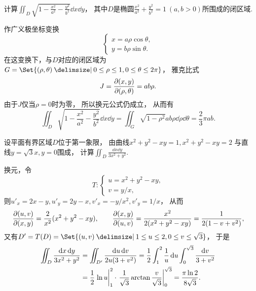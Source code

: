 \begin{example}
计算\(\iint_D \sqrt{1 - \frac{x^2}{a^2} - \frac{y^2}{b^2}} \dd{x} \dd{y}\)，
其中\(D\)是椭圆\(\frac{x^2}{a^2} + \frac{y^2}{b^2} = 1\ (a,b>0)\)所围成的闭区域.
\begin{solution}
作广义极坐标变换\begin{equation*}
	\left\{ \begin{array}{l}
		x = a \rho \cos\theta, \\
		y = b \rho \sin\theta.
	\end{array} \right.
\end{equation*}
在这变换下，与\(D\)对应的闭区域为
\(G = \Set{(\rho,\theta) \given 0\leq\rho\leq1,0\leq\theta\leq2\pi}\)，
雅克比式\begin{equation*}
	J = \pdv{ (x,y) }{ (\rho,\theta) } = ab\rho.
\end{equation*}
由于\(J\)仅当\(\rho=0\)时为零，
所以换元公式仍成立，
从而有\begin{equation*}
	\iint_D \sqrt{1 - \frac{x^2}{a^2} - \frac{y^2}{b^2}} \dd{x} \dd{y}
	= \iint_G \sqrt{1-\rho^2} ab\rho \dd{\rho} \dd{\theta}
	= \frac23 \pi ab.
\end{equation*}
\end{solution}
\end{example}

\begin{example}
设平面有界区域\(D\)位于第一象限，
由曲线\(x^2+y^2-xy=1,
x^2+y^2-xy=2\)
与直线\(y=\sqrt3 x,
y=0\)围成，
计算\(\iint_D \frac{\dd{x}\dd{y}}{3x^2+y^2}\).
\begin{solution}
换元，令\begin{equation*}
	T: \left\{ \begin{array}{l}
		u=x^2+y^2-xy, \\
		v=y/x,
	\end{array} \right.
\end{equation*}
则\(u'_x=2x-y,
u'_y=2y-x,
v'_x=-y/x^2,
v'_y=1/x\)，
从而\begin{equation*}
	\pdv{ (u,v) }{ (x,y) } = \frac2{x^2} (x^2+y^2-xy),
	\qquad
	\pdv{ (x,y) }{ (u,v) } = \frac{x^2}{2(x^2+y^2-xy)}
	= \frac1{2(1-v+v^2)},
\end{equation*}
又有\(D' = T(D)
= \Set{ (u,v) \given 1 \leq u \leq 2, 0 \leq v \leq \sqrt3 }\)，
于是\begin{align*}
	\iint_D \frac{\dd{x}\dd{y}}{3x^2+y^2}
	&= \iint_{D'} \frac{\dd{u}\dd{v}}{2u(3+v^2)}
	= \frac12 \int_1^2 \frac1u \dd{u} \int_0^{\sqrt3} \frac{\dd{v}}{3+v^2} \\
	&= \frac12 \eval{\ln u}_1^2 \cdot \eval{\frac1{\sqrt3} \arctan\frac{v}{\sqrt3}}_0^{\sqrt3}
	= \frac{\pi \ln2}{8\sqrt3}.
\end{align*}
\end{solution}
\end{example}

